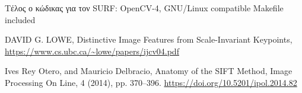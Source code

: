 \documentclass[11pt]{scrartcl} %
\begin{document}
Τέλος ο κώδικας για τον SURF:
{OpenCV-4, GNU/Linux compatible Makefile included}

\begin{thebibliography}{2}

DAVID G. LOWE, Distinctive Image Features from Scale-Invariant Keypoints,
\url{https://www.cs.ubc.ca/~lowe/papers/ijcv04.pdf}

Ives Rey Otero, and Mauricio Delbracio, Anatomy of the SIFT Method, Image Processing On Line, 4 (2014), pp. 370–396.
\url{https://doi.org/10.5201/ipol.2014.82}

\end{thebibliography}
\end{document}
